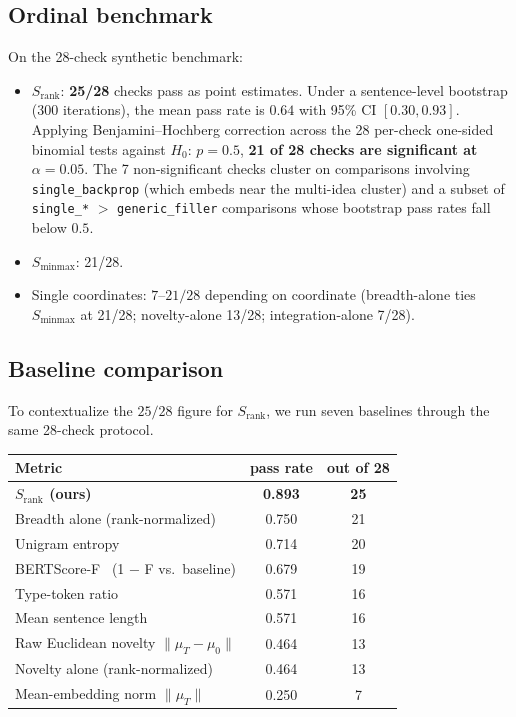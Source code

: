 \documentclass[11pt]{article}
\begin{document}
\subsection{Ordinal benchmark}

On the 28-check synthetic benchmark:
\begin{itemize}
\item $S_{\mathrm{rank}}$: \textbf{25/28} checks pass as point estimates. Under a sentence-level bootstrap (300 iterations), the mean pass rate is $0.64$ with 95\% CI $[0.30, 0.93]$. Applying Benjamini--Hochberg correction across the 28 per-check one-sided binomial tests against $H_0$: $p = 0.5$, \textbf{21 of 28 checks are significant at $\alpha = 0.05$}. The 7 non-significant checks cluster on comparisons involving \texttt{single\_backprop} (which embeds near the multi-idea cluster) and a subset of \texttt{single\_*} $>$ \texttt{generic\_filler} comparisons whose bootstrap pass rates fall below $0.5$.
\item $S_{\mathrm{minmax}}$: 21/28.
\item Single coordinates: $7$--$21/28$ depending on coordinate (breadth-alone ties $S_{\mathrm{minmax}}$ at 21/28; novelty-alone 13/28; integration-alone 7/28).
\end{itemize}

\subsection{Baseline comparison}\label{sec:baselines}

To contextualize the $25/28$ figure for $S_{\mathrm{rank}}$, we run seven baselines through the same 28-check protocol.

\begin{center}
\begin{tabular}{lcc}
\toprule
Metric & pass rate & out of 28 \\
\midrule
\textbf{$S_{\mathrm{rank}}$ (ours)} & \textbf{0.893} & \textbf{25} \\
Breadth alone (rank-normalized) & 0.750 & 21 \\
Unigram entropy                 & 0.714 & 20 \\
BERTScore-F~\cite{zhang2020bertscore} (1 $-$ F vs.\ baseline) & 0.679 & 19 \\
Type-token ratio                & 0.571 & 16 \\
Mean sentence length            & 0.571 & 16 \\
Raw Euclidean novelty $\|\mu_T - \mu_0\|$ & 0.464 & 13 \\
Novelty alone (rank-normalized) & 0.464 & 13 \\
Mean-embedding norm $\|\mu_T\|$ & 0.250 & 7  \\
\bottomrule
\end{tabular}
\end{center}
\end{document}

